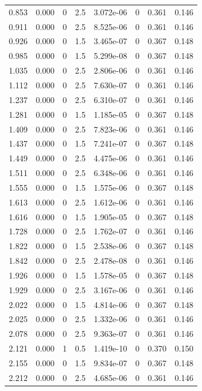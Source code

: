 \documentclass[preview]{standalone}
\begin{document}
{{\begin{tabular}{L{1.2cm}C{1.2cm} C{0.3cm}C{0.5cm} C{1.4cm}C{1.4cm} C{1.4cm}C{1.4cm}}
  0.853  &  0.000  & 0     & 2.5 &  3.072e-06  & 0  & 0.361 &  0.146   \\ 
  0.911  &  0.000  & 0     & 2.5 &  8.525e-06  & 0  & 0.361 &  0.146   \\ 
  0.926  &  0.000  & 0     & 1.5 &  3.465e-07  & 0  & 0.367 &  0.148   \\ 
  0.985  &  0.000  & 0     & 1.5 &  5.299e-08  & 0  & 0.367 &  0.148   \\ 
  1.035  &  0.000  & 0     & 2.5 &  2.806e-06  & 0  & 0.361 &  0.146   \\ 
  1.112  &  0.000  & 0     & 2.5 &  7.630e-07  & 0  & 0.361 &  0.146   \\ 
  1.237  &  0.000  & 0     & 2.5 &  6.310e-07  & 0  & 0.361 &  0.146   \\ 
  1.281  &  0.000  & 0     & 1.5 &  1.185e-05  & 0  & 0.367 &  0.148   \\ 
  1.409  &  0.000  & 0     & 2.5 &  7.823e-06  & 0  & 0.361 &  0.146   \\ 
  1.437  &  0.000  & 0     & 1.5 &  7.241e-07  & 0  & 0.367 &  0.148   \\ 
  1.449  &  0.000  & 0     & 2.5 &  4.475e-06  & 0  & 0.361 &  0.146   \\ 
  1.511  &  0.000  & 0     & 2.5 &  6.348e-06  & 0  & 0.361 &  0.146   \\ 
  1.555  &  0.000  & 0     & 1.5 &  1.575e-06  & 0  & 0.367 &  0.148   \\ 
  1.613  &  0.000  & 0     & 2.5 &  1.612e-06  & 0  & 0.361 &  0.146   \\ 
  1.616  &  0.000  & 0     & 1.5 &  1.905e-05  & 0  & 0.367 &  0.148   \\ 
  1.728  &  0.000  & 0     & 2.5 &  1.762e-07  & 0  & 0.361 &  0.146   \\ 
  1.822  &  0.000  & 0     & 1.5 &  2.538e-06  & 0  & 0.367 &  0.148   \\ 
  1.842  &  0.000  & 0     & 2.5 &  2.478e-08  & 0  & 0.361 &  0.146   \\ 
  1.926  &  0.000  & 0     & 1.5 &  1.578e-05  & 0  & 0.367 &  0.148   \\ 
  1.929  &  0.000  & 0     & 2.5 &  3.167e-06  & 0  & 0.361 &  0.146   \\ 
  2.022  &  0.000  & 0     & 1.5 &  4.814e-06  & 0  & 0.367 &  0.148   \\ 
  2.025  &  0.000  & 0     & 2.5 &  1.332e-06  & 0  & 0.361 &  0.146   \\ 
  2.078  &  0.000  & 0     & 2.5 &  9.363e-07  & 0  & 0.361 &  0.146   \\ 
  2.121  &  0.000  & 1     & 0.5 &  1.419e-10  & 0  & 0.370 &  0.150   \\ 
  2.155  &  0.000  & 0     & 1.5 &  9.834e-07  & 0  & 0.367 &  0.148   \\ 
  2.212  &  0.000  & 0     & 2.5 &  4.685e-06  & 0  & 0.361 &  0.146   \\ 
\hline 
\end{tabular} 

}}
\end{document}
